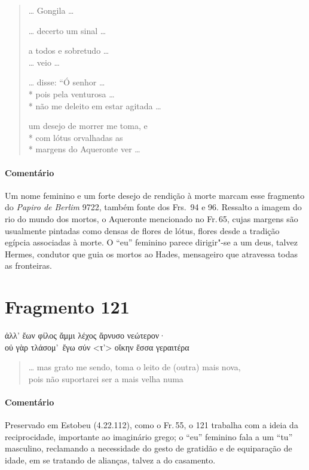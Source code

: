 \pagebreak
\begin{verse}
\ldots{} Gongila \ldots{}

\ldots{} decerto um sinal \ldots{}

a todos e sobretudo \ldots{}\\
\ldots{} veio \ldots{}

\ldots{} disse: “Ó senhor \ldots{}\\*
pois pela venturosa \ldots{}\\*
não me deleito em estar agitada \ldots{}

um desejo de morrer me toma, e\\*
com lótus orvalhadas as\\*
margens do Aqueronte ver \ldots{}
\end{verse}

{\paragraph{Comentário} Um nome feminino e um forte desejo de rendição à morte marcam esse fragmento do
\textit{Papiro de Berlim }9722, também fonte dos Frs.~94 e 96. Ressalto a imagem do
rio do mundo dos mortos, o Aqueronte mencionado no Fr.\,65, cujas margens são usualmente pintadas
como densas de flores de lótus, flores desde a tradição egípcia associadas à morte. O “eu” feminino parece dirigir"-se a um deus,
talvez Hermes, condutor que guia os mortos ao Hades, mensageiro que atravessa todas as fronteiras.}

\pagebreak
\section{Fragmento 121}

\begin{gkverse}
ἀλλ’ ἔων φίλος ἄμμι λέχος ἄρνυσο νεώτερον·\\
οὐ γὰρ τλάσομ’ ἔγω σύν <τ’> οἴκην ἔσσα γεραιτέρα
\end{gkverse}

\begin{verse}
\ldots{} mas grato me sendo, toma o leito de (outra) mais nova,\\
pois não suportarei ser a mais velha numa 
\end{verse}

{\paragraph{Comentário} Preservado em Estobeu (4.22.112), como o Fr.\,55, o 121 trabalha com a ideia da
reciprocidade, importante ao imaginário grego; o “eu” feminino fala a um “tu”
masculino, reclamando a necessidade do gesto de gratidão e de equiparação de
idade, em se tratando de alianças, talvez a do casamento.}

